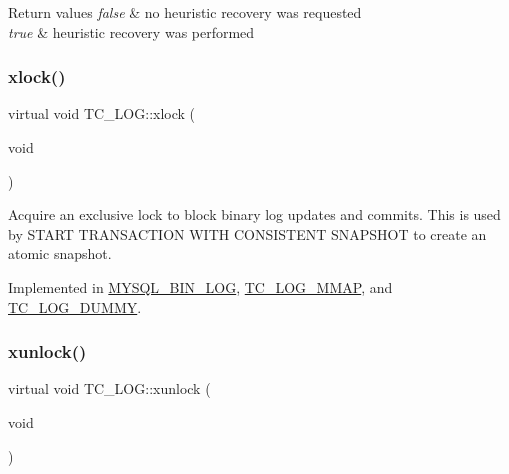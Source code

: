 \begin{DoxyRetVals}{Return values}
{\em false} & no heuristic recovery was requested \\
\hline
{\em true} & heuristic recovery was performed \\
\hline
\end{DoxyRetVals}
\mbox{\label{classTC__LOG_aac75dc061e9aae27449e675b23c27ae3}} 
\subsubsection{\texorpdfstring{xlock()}{xlock()}}
{\footnotesize\ttfamily virtual void T\+C\+\_\+\+L\+O\+G\+::xlock (\begin{DoxyParamCaption}\item[{void}]{ }\end{DoxyParamCaption})\hspace{0.3cm}{\ttfamily [pure virtual]}}

Acquire an exclusive lock to block binary log updates and commits. This is used by S\+T\+A\+RT T\+R\+A\+N\+S\+A\+C\+T\+I\+ON W\+I\+TH C\+O\+N\+S\+I\+S\+T\+E\+NT S\+N\+A\+P\+S\+H\+OT to create an atomic snapshot. 

Implemented in \mbox{\hyperlink{group__Binary__Log_ga5ebea3ac42b19b6e1c86ca33c3cb28e7}{M\+Y\+S\+Q\+L\+\_\+\+B\+I\+N\+\_\+\+L\+OG}}, \mbox{\hyperlink{classTC__LOG__MMAP_ab6e8fad0d9b8167b22d22f4372739202}{T\+C\+\_\+\+L\+O\+G\+\_\+\+M\+M\+AP}}, and \mbox{\hyperlink{classTC__LOG__DUMMY_a48cd538ebda31693671772018d2563b9}{T\+C\+\_\+\+L\+O\+G\+\_\+\+D\+U\+M\+MY}}.

\mbox{\label{classTC__LOG_a60ee380273adc9e23c56ff114cd2636a}} 
\subsubsection{\texorpdfstring{xunlock()}{xunlock()}}
{\footnotesize\ttfamily virtual void T\+C\+\_\+\+L\+O\+G\+::xunlock (\begin{DoxyParamCaption}\item[{void}]{ }\end{DoxyParamCaption})\hspace{0.3cm}{\ttfamily [pure virtual]}}


